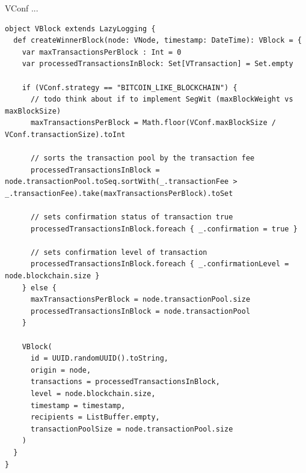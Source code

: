 VConf ...

\begin{minipage}{\linewidth}
\begin{lstlisting}[style=myScalastyle]
object VBlock extends LazyLogging {
  def createWinnerBlock(node: VNode, timestamp: DateTime): VBlock = {
    var maxTransactionsPerBlock : Int = 0
    var processedTransactionsInBlock: Set[VTransaction] = Set.empty

    if (VConf.strategy == "BITCOIN_LIKE_BLOCKCHAIN") {
      // todo think about if to implement SegWit (maxBlockWeight vs maxBlockSize)
      maxTransactionsPerBlock = Math.floor(VConf.maxBlockSize / VConf.transactionSize).toInt

      // sorts the transaction pool by the transaction fee
      processedTransactionsInBlock = node.transactionPool.toSeq.sortWith(_.transactionFee > _.transactionFee).take(maxTransactionsPerBlock).toSet

      // sets confirmation status of transaction true
      processedTransactionsInBlock.foreach { _.confirmation = true }

      // sets confirmation level of transaction
      processedTransactionsInBlock.foreach { _.confirmationLevel = node.blockchain.size }
    } else {
      maxTransactionsPerBlock = node.transactionPool.size
      processedTransactionsInBlock = node.transactionPool
    }

    VBlock(
      id = UUID.randomUUID().toString,
      origin = node,
      transactions = processedTransactionsInBlock,
      level = node.blockchain.size,
      timestamp = timestamp,
      recipients = ListBuffer.empty,
      transactionPoolSize = node.transactionPool.size
    )
  }
}
\end{lstlisting}
\end{minipage}